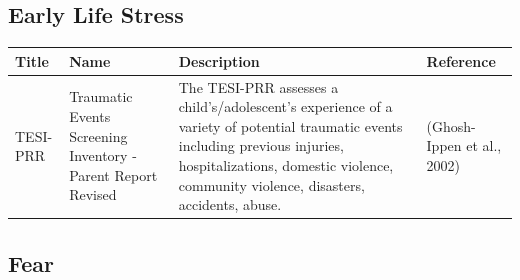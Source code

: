 \documentclass[]{book}
\begin{document}
\hypertarget{early-life-stress}{%
\subsection{Early Life Stress}\label{early-life-stress}}

\begin{longtable}[]{@{}llll@{}}
\toprule
\begin{minipage}[b]{0.13\columnwidth}\raggedright
Title\strut
\end{minipage} & \begin{minipage}[b]{0.21\columnwidth}\raggedright
Name\strut
\end{minipage} & \begin{minipage}[b]{0.38\columnwidth}\raggedright
Description\strut
\end{minipage} & \begin{minipage}[b]{0.15\columnwidth}\raggedright
Reference\strut
\end{minipage}\tabularnewline
\midrule
\endhead
\begin{minipage}[t]{0.13\columnwidth}\raggedright
TESI-PRR\strut
\end{minipage} & \begin{minipage}[t]{0.21\columnwidth}\raggedright
Traumatic Events Screening Inventory - Parent Report Revised\strut
\end{minipage} & \begin{minipage}[t]{0.38\columnwidth}\raggedright
The TESI-PRR assesses a child's/adolescent's experience of a variety of potential traumatic events including previous injuries, hospitalizations, domestic violence, community violence, disasters, accidents, abuse.\strut
\end{minipage} & \begin{minipage}[t]{0.15\columnwidth}\raggedright
(Ghosh-Ippen et al., 2002)\strut
\end{minipage}\tabularnewline
\bottomrule
\end{longtable}

\hypertarget{fear}{%
\subsection{Fear}\label{fear}}
\end{document}
